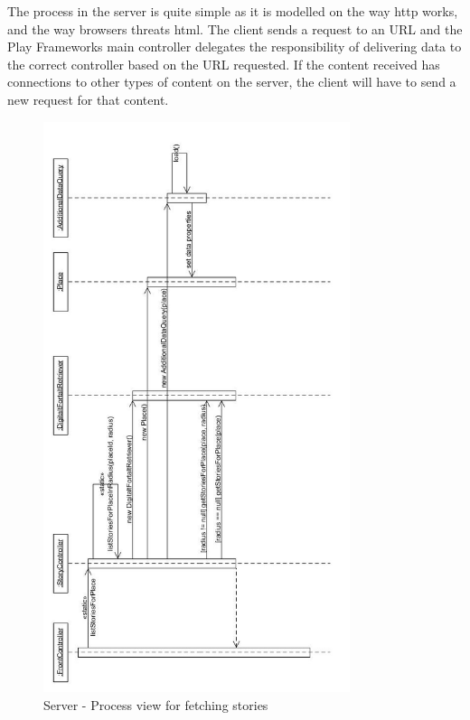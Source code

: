 \documentclass[11pt]{book}
\begin{document}
The process in the server is quite simple as it is modelled on the way \gls{http} works, and the way browsers threats \gls{html}. The client sends a request to an URL and the Play Frameworks main controller delegates the  responsibility of delivering data to the correct controller based on the URL requested. If the content received has connections to other types of content on the server, the client will have to send a new request for that content.

\begin{figure}[H]
      \centering
      \includegraphics[width=0.8\textwidth]{Figures/Architecture/Sequence/story.jpg}
      \caption{Server - Process view for fetching stories}
      \label{fig:arch_server_process_story}
\end{figure}
\end{document}
